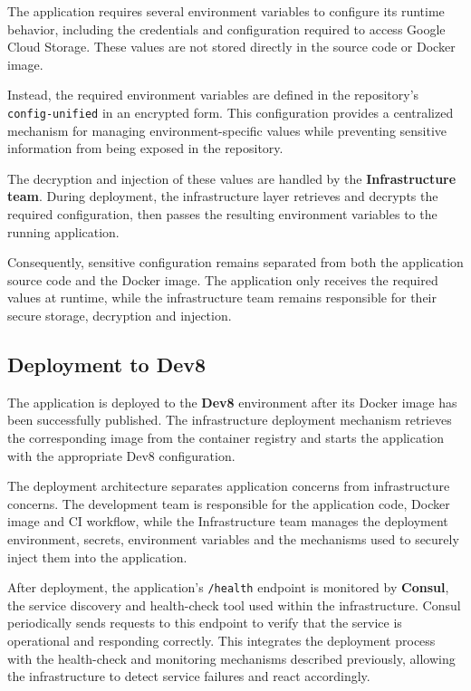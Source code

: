 The application requires several environment variables to configure its runtime behavior, including the credentials and configuration required to access Google Cloud Storage. These values are not stored directly in the source code or Docker image.

Instead, the required environment variables are defined in the repository's \texttt{config-unified} in an encrypted form. This configuration provides a centralized mechanism for managing environment-specific values while preventing sensitive information from being exposed in the repository.

The decryption and injection of these values are handled by the \textbf{Infrastructure team}. During deployment, the infrastructure layer retrieves and decrypts the required configuration, then passes the resulting environment variables to the running application.

Consequently, sensitive configuration remains separated from both the application source code and the Docker image. The application only receives the required values at runtime, while the infrastructure team remains responsible for their secure storage, decryption and injection.

\subsection{Deployment to Dev8}

The application is deployed to the \textbf{Dev8} environment after its Docker image has been successfully published. The infrastructure deployment mechanism retrieves the corresponding image from the container registry and starts the application with the appropriate Dev8 configuration.

The deployment architecture separates application concerns from infrastructure concerns. The development team is responsible for the application code, Docker image and CI workflow, while the Infrastructure team manages the deployment environment, secrets, environment variables and the mechanisms used to securely inject them into the application.

After deployment, the application's \texttt{/health} endpoint is monitored by \textbf{Consul}, the service discovery and health-check tool used within the infrastructure. Consul periodically sends requests to this endpoint to verify that the service is operational and responding correctly. This integrates the deployment process with the health-check and monitoring mechanisms described previously, allowing the infrastructure to detect service failures and react accordingly.

